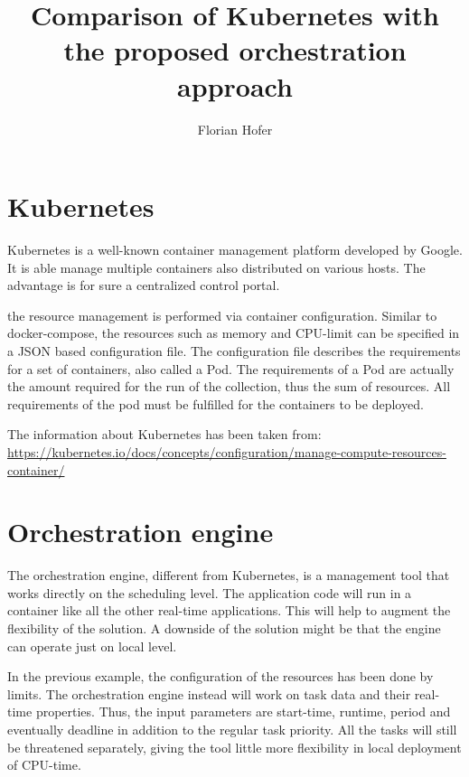 \documentclass[]{scrartcl}
\title{Comparison of Kubernetes with the proposed orchestration approach}
\author{Florian Hofer}
\begin{document}
\maketitle

\begin{abstract}

\end{abstract}

\section{Kubernetes}

Kubernetes is a well-known container management platform developed by Google. It is able manage multiple containers also distributed on various hosts. The advantage is for sure a centralized control portal. 

the resource management is performed via container configuration. Similar to docker-compose, the resources such as memory and CPU-limit can be specified in a JSON based configuration file. The configuration file describes the requirements for a set of containers, also called a Pod. The requirements of a Pod are actually the amount required for the run of the collection, thus the sum of resources. All requirements of the pod must be fulfilled for the containers to be deployed.


The information about Kubernetes has been taken from:
\url{https://kubernetes.io/docs/concepts/configuration/manage-compute-resources-container/}


\section{Orchestration engine}

The orchestration engine, different from Kubernetes, is a management tool that works directly on the scheduling level. The application code will run in a container like all the other real-time applications. This will help to augment the flexibility of the solution. A downside of the solution might be that the engine can operate just on local level.

In the previous example, the configuration of the resources has been done by limits. The orchestration engine instead will work on task data and their real-time properties. 
Thus, the input parameters are start-time, runtime, period and eventually deadline in addition to the regular task priority.
All the tasks will still be threatened separately, giving the tool little more flexibility in local deployment of CPU-time.
\end{document}
